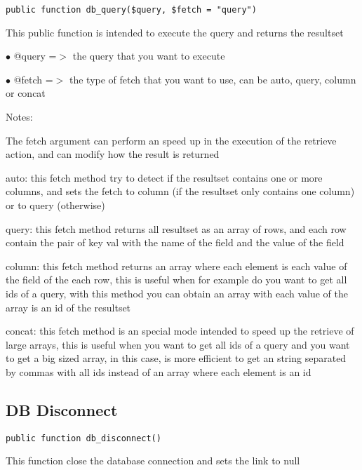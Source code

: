 \documentclass[a4paper]{book}
\begin{document}
\begin{lstlisting}
public function db_query($query, $fetch = "query")
\end{lstlisting}

This public function is intended to execute the query and returns the resultset

\begin{compactitem}
\item[\color{myblue}$\bullet$] @query =$>$ the query that you want to execute
\item[\color{myblue}$\bullet$] @fetch =$>$ the type of fetch that you want to use, can be auto, query, column or concat
\end{compactitem}

Notes:

The fetch argument can perform an speed up in the execution of the retrieve action, and
can modify how the result is returned

auto: this fetch method try to detect if the resultset contains one or more columns, and
sets the fetch to column (if the resultset only contains one column) or to query (otherwise)

query: this fetch method returns all resultset as an array of rows, and each row contain the
pair of key val with the name of the field and the value of the field

column: this fetch method returns an array where each element is each value of the field of
the each row, this is useful when for example do you want to get all ids of a query, with
this method you can obtain an array with each value of the array is an id of the resultset

concat: this fetch method is an special mode intended to speed up the retrieve of large
arrays, this is useful when you want to get all ids of a query and you want to get a big
sized array, in this case, is more efficient to get an string separated by commas with all
ids instead of an array where each element is an id

\hypertarget{toc322}{}
\subsection{DB Disconnect}

\begin{lstlisting}
public function db_disconnect()
\end{lstlisting}

This function close the database connection and sets the link to null
\end{document}
